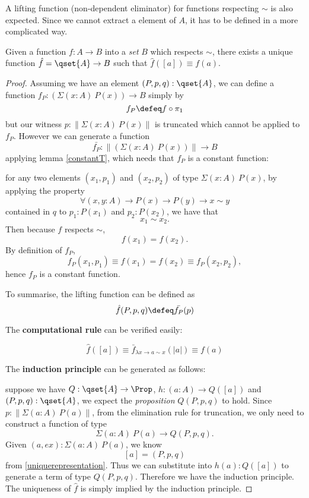 A lifting function (non-dependent eliminator) for functions respecting
$\sim$ is also expected. Since we cannot extract a element of $A$, it
has to be defined in a more complicated way.

\begin{lemma}
Given a function $f : A \to B$ into a \emph{set} $B$ which respects $\sim$, there exists a unique function $\hat{f} = \qset{A} \to B$ such that $\hat{f} ([ a ]) \equiv f(a)$.
\end{lemma}
\begin{proof}
Assuming we have an element $(P, p, q) : \qset{A}$, we can define a
function $f_{P} : (\Sigma (x : A) ~P(x)) \to B$ simply by
$$f_{P} \defeq f \circ \pi_{1}$$
but our witness $p : \| \Sigma (x : A) ~P(x) \|$ is truncated which
cannot be applied to $f_{P}$. However we can generate a function
$$\bar{f_{P}} : \| (\Sigma (x : A) ~P(x)) \| \to B$$
applying lemma \ref{constantT}, which needs that $f_{P}$ is a constant function:

for any two elements $(x_1,p_1)$ and $(x_2,p_2)$ of type $\Sigma (x :
A) ~P(x)$, by applying the property
$$\forall(x,y : A) \to P(x) \to P(y) \to x \sim y$$
contained in $q$ to $p_1 : P(x_1)$ and $p_2 : P(x_2)$, we have that
$$x_1 \sim x_2.$$
Then because $f$ respects $\sim$,
$$f(x_1) = f(x_2).$$
By definition of $f_P$,
$$f_P(x_1,p_1) \equiv f (x_1) = f(x_2) \equiv f_P(x_2,p_2),$$
hence $f_P$ is a constant function.

To summarise, the lifting function can be defined as
$$\hat{f}(P,p,q) \defeq \bar{f_{P}}(p)$$

The \textbf{computational rule} can be verified easily:

$$\hat{f}([a]) \equiv \bar{f}_{\lambda x \to a \sim x}(|a|) \equiv f(a)$$

The \textbf{induction principle} can be generated as follows:

suppose we have $Q : \qset{A} \to \Prop$, $h : (a : A) \to Q([a])$ and
$(P,p,q) : \qset{A}$, we expect the \emph{proposition} $Q(P,p,q)$ to
hold. Since $p : \| \Sigma (a : A) ~ P(a) \|$, from the elimination
rule for truncation, we only need to construct a function of type
$$\Sigma (a : A) ~ P(a) \to Q(P,p,q).$$
Given $(a,ex) : \Sigma (a : A) ~ P(a)$, we know
$$[a] = (P,p,q)$$
from \ref{uniquerepresentation}. Thus we can substitute into $h(a) : Q([a])$ to generate a term of type $Q(P,p,q)$. Therefore we have the induction principle. The uniqueness of $\hat{f}$ is simply implied by the induction principle.
\end{proof}

